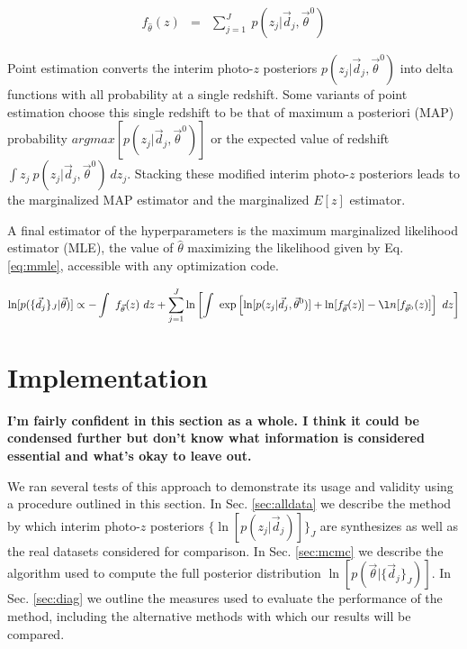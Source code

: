 \documentclass[preprint]{aastex}
\begin{document}
\begin{eqnarray}
\label{eq:stack}
f_{\hat{\theta}}(z) &=& \sum_{j=1}^{J}\ p(z_{j}|\vec{d}_{j},\vec{\theta}^{0})
\end{eqnarray}

Point estimation converts the interim photo-$z$ posteriors 
$p(z_{j}|\vec{d}_{j},\vec{\theta}^{0})$ into delta functions with all 
probability at a single redshift.  Some variants of point estimation choose 
this single redshift to be that of maximum a posteriori (MAP) probability 
$argmax[p(z_{j}|\vec{d}_{j},\vec{\theta}^{0})]$ or the expected value of 
redshift $\int z_{j}\ p(z_{j}|\vec{d}_{j},\vec{\theta}^{0})\ dz_{j}$.  Stacking 
these modified interim photo-$z$ posteriors leads to the marginalized MAP 
estimator and the marginalized $E[z]$ estimator.

A final estimator of the hyperparameters is the maximum marginalized likelihood 
estimator (MLE), the value of $\hat{\theta}$ maximizing the likelihood given by 
Eq. \ref{eq:mmle}, accessible with any optimization code.

\begin{eqnarray}
\label{eq:mmle}
\ln[p(\{\vec{d}_{j}\}_{J}|\vec{\theta})] \propto -\int\ f_{\vec{\theta}}(z)\ 
dz+\sum_{j=1}^{J}\ln\left[\int\ 
\exp\left[\ln[p(z_{j}|\vec{d}_{j},\vec{\theta}^{0})]+\ln[f_{\vec{\theta}}(z)]-\l
n[f_{\vec{\theta}^{0}}(z)]\right]\ dz\right]
\end{eqnarray}

\clearpage
\section{Implementation}
\label{sec:exp}

\textbf{I'm fairly confident in this section as a whole.  I think it could be 
condensed further but don't know what information is considered essential and 
what's okay to leave out.}

We ran several tests of this approach to demonstrate its usage and validity 
using a procedure outlined in this section.  In Sec. \ref{sec:alldata} we 
describe the method by which interim photo-$z$ posteriors 
$\{\ln[p(z_{j}|\vec{d}_{j})]\}_{J}$ are synthesizes as well as the real 
datasets considered for comparison.  In Sec. \ref{sec:mcmc} we describe the 
algorithm used to compute the full posterior distribution 
$\ln[p(\vec{\theta}|\{\vec{d}_{j}\}_{J})]$.  In Sec. \ref{sec:diag} we outline 
the measures used to evaluate the performance of the method, including the 
alternative methods with which our results will be compared.
\end{document}
